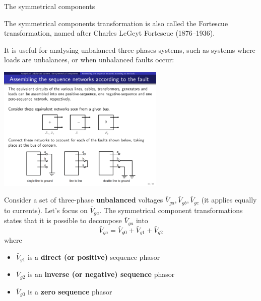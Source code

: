 \begin{frame}[allowframebreaks]{The symmetrical components}

The symmetrical components transformation is also called the Fortescue transformation, named after Charles LeGeyt Fortescue (1876–1936).

It is useful for analysing unbalanced three-phases systems, such as systems where loads are unbalances, or when unbalanced faults occur:

\begin{center}
    \includegraphics[width=0.6\textwidth]{images/faults.pdf}
\end{center}


Consider a set of three-phase \textbf{unbalanced} voltages $\bar{V}_{ga}, \bar{V}_{gb}, \bar{V}_{gc}$ (it applies equally to currents). 
Let's focus on $\bar{V}_{ga}$. 
The symmetrical component transformations states that it is possible to decompose $\bar{V}_{ga}$ into
$$\bar{V}_{ga} = \bar{V}_{g0} + \bar{V}_{g1} + \bar{V}_{g2} $$
where 
\begin{itemize}
    \item $\bar{V}_{g1}$ is a \textbf{direct (or positive)} sequence phasor
    \item $\bar{V}_{g2}$ is an \textbf{inverse (or negative) sequence} phasor
    \item $\bar{V}_{g0}$ is a \textbf{zero sequence} phasor
\end{itemize}


\end{frame}
